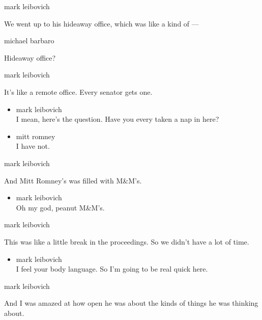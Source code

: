 mark leibovich

We went up to his hideaway office, which was like a kind of ---

michael barbaro

Hideaway office?

mark leibovich

It's like a remote office. Every senator gets one.

\begin{itemize}
\item
  mark leibovich\\
  I mean, here's the question. Have you every taken a nap in here?
\item
  mitt romney\\
  I have not.
\end{itemize}

mark leibovich

And Mitt Romney's was filled with M\&M's.

\begin{itemize}
\tightlist
\item
  mark leibovich\\
  Oh my god, peanut M\&M's.
\end{itemize}

mark leibovich

This was like a little break in the proceedings. So we didn't have a lot
of time.

\begin{itemize}
\tightlist
\item
  mark leibovich\\
  I feel your body language. So I'm going to be real quick here.
\end{itemize}

mark leibovich

And I was amazed at how open he was about the kinds of things he was
thinking about.

